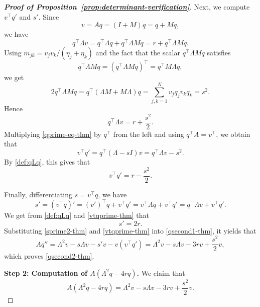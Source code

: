 \documentclass[11pt]{article}
\numberwithin{equation}{section}
\theoremstyle{definition}
\begin{document}
\begin{proof}[\normalfont\bfseries Proof of Proposition~\ref{prop:determinant-verification}]
Next, we compute $v^\top q'$ and $s'$. Since
\[v=Aq=(I+M)q=q+Mq,\]
 we have
\[
q^\top\Lambda v
=
q^\top\Lambda q+q^\top\Lambda Mq
=
r+q^\top\Lambda Mq.
\]
Using \(m_{jk}=v_jv_k/(\eta_j+\eta_k)\) and the fact that
the scalar
\(q^\top\Lambda Mq\) satisfies
\[
q^\top\Lambda Mq=(q^\top\Lambda Mq)^\top=q^\top M\Lambda q,
\]
we get
\[
2q^\top\Lambda Mq
=
q^\top(\Lambda M+M\Lambda)q
=
\sum_{j,k=1}^N v_jq_jv_kq_k
=
s^2.
\]
Hence
\begin{equation}\label{def:qLq}
	q^\top\Lambda v
	=
	r+\frac{s^2}{2}.
\end{equation}
Multiplying \eqref{qprime-eq-thm} by \(q^\top\) from the left and
using \(q^\top A=v^\top\), we obtain that
\[
v^\top q'
=
q^\top(\Lambda-sI)v
=
q^\top\Lambda v-s^2.
\]
By \eqref{def:qLq}, this gives that
\begin{equation}\label{vtqprime-thm}
	v^\top q'
	=
	r-\frac{s^2}{2}.
\end{equation}



Finally, differentiating \(s=v^\top q\), we have
\[
s'
=
(v^\top q)'
=
(v')^\top q+v^\top q'
=v^\top\Lambda q +v^\top q'
=q^\top\Lambda v+v^\top q'.
\]
We get from \eqref{def:qLq} and \eqref{vtqprime-thm} that
\begin{equation}\label{sprime2-thm}
	s'=2r.
\end{equation}
Substituting \eqref{sprime2-thm} and \eqref{vtqprime-thm} into
\eqref{qsecond1-thm}, it yields that
\[
Aq''
=
\Lambda^2v-s\Lambda v-s'v-v(v^\top q')
=
\Lambda^2v-s\Lambda v-3rv+\frac{s^2}{2}v,
\]
which proves \eqref{qsecond2-thm}.



































\medskip
\noindent
\textbf{Step 2: Computation of $A(\Lambda^2q-4rq)$.}
We claim that
\begin{equation}\label{def:cla1}
A(\Lambda^2q-4rq)
=
\Lambda^2v-s\Lambda v-3rv+\frac{s^2}{2}v.	
\end{equation}




\end{proof}
\end{document}

